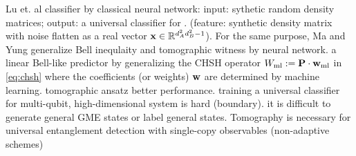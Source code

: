 \documentclass[
reprint,
aps,
pra,
floatfix,
]{revtex4-2}
\theoremstyle{plain}
\theoremstyle{definition}
\newtheorem{remark}{Remark}
\newcommand{\ew}{W}
\begin{document}
Lu et. al \cite{luSeparabilityEntanglementClassifierMachine2018} 
 classifier by classical neural network:
input: sythetic random density matrices;
output: a universal classifier for .
(feature: synthetic density matrix with noise flatten as a real vector $\vb{x}\in\mathbb{R}^{d_A^2d_B^2-1}$). 
For the same purpose, Ma and Yung \cite{maTransformingBellInequalities2018} generalize Bell inequlaity and tomographic witness by neural network. 
a linear Bell-like predictor by generalizing the CHSH operator $\ew_{\text{ml}}:=\vb{P}\cdot\vb{w}_{\text{ml}}$ in \cref{eq:chsh} where the coefficients (or weights) $\vb{w}$ are determined by machine learning.
tomographic ansatz better performance.
training a universal classifier for multi-qubit, high-dimensional system is hard (boundary).
it is difficult to generate general GME states or label general states.
Tomography is necessary for universal entanglement detection with single-copy observables (non-adaptive schemes) \cite{luTomographyNecessaryUniversal2016}
\end{document}
